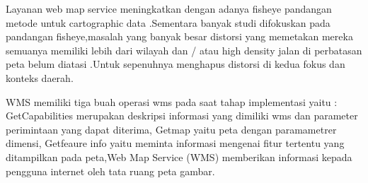 Layanan web map service  meningkatkan dengan  adanya fisheye pandangan metode untuk cartographic data .Sementara banyak studi difokuskan pada pandangan fisheye,masalah yang banyak besar distorsi yang memetakan mereka semuanya memiliki lebih dari wilayah dan / atau high density jalan di perbatasan peta belum diatasi .Untuk sepenuhnya menghapus distorsi di kedua fokus dan konteks daerah.

WMS memiliki tiga buah operasi wms pada saat tahap implementasi yaitu : GetCapabilities merupakan deskripsi informasi yang dimiliki wms
dan parameter perimintaan yang dapat diterima, Getmap yaitu peta dengan paramametrer dimensi, Getfeaure info yaitu meminta informasi 
mengenai fitur tertentu yang ditampilkan pada peta,Web Map Service (WMS) memberikan informasi kepada pengguna internet oleh tata ruang peta gambar.
